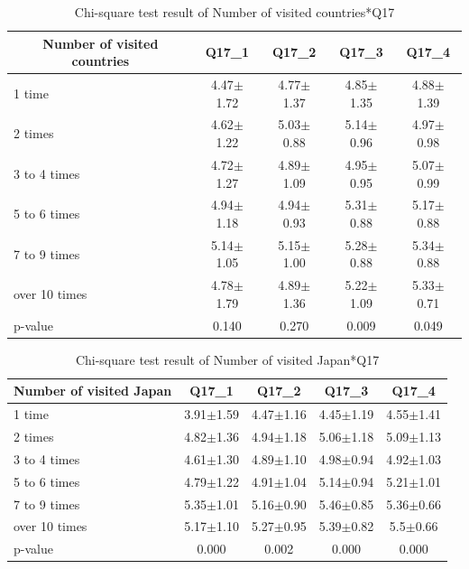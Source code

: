 \begin{table}[h]
  \caption{Chi-square test result of Number of visited countries*Q17}
  \label{table32b}
  \centering
  \begin{tabular}{l|cccc}
 \hline
        \multicolumn{1}{c|}{Number of visited countries}          & Q17\_1               & Q17\_2 & Q17\_3    & Q17\_4       \\
\hline
1 time        & 4.47$\pm$1.72           & 4.77$\pm$1.37  & 4.85$\pm$1.35 & 4.88$\pm$1.39  \\
2 times       & 4.62$\pm$1.22 & 5.03$\pm$0.88 & 5.14$\pm$0.96 & 4.97$\pm$0.98  \\
3 to 4 times  & 4.72$\pm$1.27 & 4.89$\pm$1.09 & 4.95$\pm$0.95& 5.07$\pm$0.99 \\
5 to 6 times  & 4.94$\pm$1.18 & 4.94$\pm$0.93& 5.31$\pm$0.88 & 5.17$\pm$0.88 \\
7 to 9 times  & 5.14$\pm$1.05 & 5.15$\pm$1.00 & 5.28$\pm$0.88 & 5.34$\pm$0.88 \\
over 10 times & 4.78$\pm$1.79& 4.89$\pm$1.36 & 5.22$\pm$1.09 & 5.33$\pm$0.71\\
\hline
p-value&           0.140&         0.270&         0.009&   0.049     \\
 \hline
  \end{tabular}
\end{table}

\begin{table}[h]
  \caption{Chi-square test result of Number of visited Japan*Q17}
  \label{table32c}
  \centering
  \begin{tabular}{l|cccc}
 \hline
        \multicolumn{1}{c|}{Number of visited Japan}          & Q17\_1               & Q17\_2 & Q17\_3    & Q17\_4       \\
\hline
1 time        & 3.91$\pm$1.59 & 4.47$\pm$1.16   & 4.45$\pm$1.19   & 4.55$\pm$1.41 \\
2 times       & 4.82$\pm$1.36 & 4.94$\pm$1.18  & 5.06$\pm$1.18   & 5.09$\pm$1.13 \\
3 to 4 times  & 4.61$\pm$1.30 & 4.89$\pm$1.10 & 4.98$\pm$0.94 & 4.92$\pm$1.03  \\
5 to 6 times  & 4.79$\pm$1.22 & 4.91$\pm$1.04 & 5.14$\pm$0.94 & 5.21$\pm$1.01 \\
7 to 9 times  & 5.35$\pm$1.01 & 5.16$\pm$0.90 & 5.46$\pm$0.85 & 5.36$\pm$0.66 \\
over 10 times & 5.17$\pm$1.10& 5.27$\pm$0.95 & 5.39$\pm$0.82 & 5.5$\pm$0.66 \\           
\hline
p-value&           0.000&         0.002&         0.000&   0.000   \\
 \hline
  \end{tabular}
\end{table}

